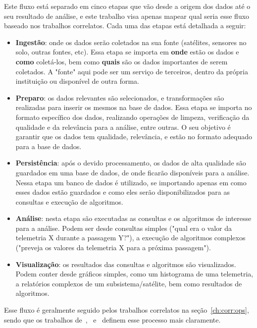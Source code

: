Este fluxo está separado em cinco etapas que vão desde a origem dos dados até o seu resultado de análise, e este trabalho visa apenas mapear qual seria esse fluxo baseado nos trabalhos correlatos.
Cada uma das etapas está detalhada a seguir:

\begin{itemize}
	\item \textbf{Ingestão}: onde os dados serão coletados na sua fonte (satélites, sensores no solo, outras fontes, etc).
	      Essa etapa se importa em \textbf{onde} estão os dados e \textbf{como} coletá-los, bem como \textbf{quais} são os dados importantes de serem coletados.
	      A "fonte" aqui pode ser um serviço de terceiros, dentro da própria instituição ou disponível de outra forma.
	\item \textbf{Preparo}: os dados relevantes são selecionados, e transformações são realizadas para inserir os mesmos na base de dados.
	      Essa etapa se importa no formato específico dos dados, realizando operações de limpeza, verificação da qualidade e da relevância para a análise, entre outras.
	      O seu objetivo é garantir que os dados tem qualidade, relevância, e estão no formato adequado para a base de dados.
	\item \textbf{Persistência}: após o devido processamento, os dados de alta qualidade são guardados em uma base de dados, de onde ficarão disponíveis para a análise.
	      Nessa etapa um banco de dados é utilizado, se importando apenas em como esses dados estão guardados e como eles serão disponibilizados para as consultas e execução de algoritmos.
	\item \textbf{Análise}: nesta etapa são executadas as consultas e os algoritmos de interesse para a análise.
	      Podem ser desde consultas simples ("qual era o valor da telemetria X durante a passagem Y?"), a execução de algoritmos complexos ("preveja os valores da telemetria X para a próxima passagem").
	\item \textbf{Visualização}: os resultados das consultas e algoritmos são visualizados.
	      Podem conter desde gráficos simples, como um histograma de uma telemetria, a relatórios complexos de um subsistema/satélite, bem como resultados de algoritmos.
\end{itemize}

Esse fluxo é geralmente seguido pelos trabalhos correlatos na seção~\ref{ch:corr:ops}, sendo que os trabalhos de~\cite{zhangBigDataFramework2017},~\cite{mateikUsingBigData2017} e~\cite{boussoufBigDataBased2018} definem esse processo mais claramente.

